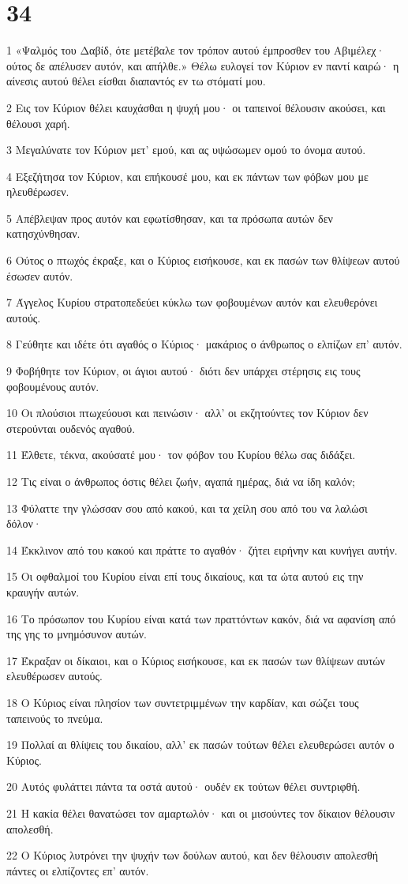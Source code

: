 \chapter{34}

\par 1 «Ψαλμός του Δαβίδ, ότε μετέβαλε τον τρόπον αυτού έμπροσθεν του Αβιμέλεχ· ούτος δε απέλυσεν αυτόν, και απήλθε.» Θέλω ευλογεί τον Κύριον εν παντί καιρώ· η αίνεσις αυτού θέλει είσθαι διαπαντός εν τω στόματί μου.
\par 2 Εις τον Κύριον θέλει καυχάσθαι η ψυχή μου· οι ταπεινοί θέλουσιν ακούσει, και θέλουσι χαρή.
\par 3 Μεγαλύνατε τον Κύριον μετ' εμού, και ας υψώσωμεν ομού το όνομα αυτού.
\par 4 Εξεζήτησα τον Κύριον, και επήκουσέ μου, και εκ πάντων των φόβων μου με ηλευθέρωσεν.
\par 5 Απέβλεψαν προς αυτόν και εφωτίσθησαν, και τα πρόσωπα αυτών δεν κατησχύνθησαν.
\par 6 Ούτος ο πτωχός έκραξε, και ο Κύριος εισήκουσε, και εκ πασών των θλίψεων αυτού έσωσεν αυτόν.
\par 7 Άγγελος Κυρίου στρατοπεδεύει κύκλω των φοβουμένων αυτόν και ελευθερόνει αυτούς.
\par 8 Γεύθητε και ιδέτε ότι αγαθός ο Κύριος· μακάριος ο άνθρωπος ο ελπίζων επ' αυτόν.
\par 9 Φοβήθητε τον Κύριον, οι άγιοι αυτού· διότι δεν υπάρχει στέρησις εις τους φοβουμένους αυτόν.
\par 10 Οι πλούσιοι πτωχεύουσι και πεινώσιν· αλλ' οι εκζητούντες τον Κύριον δεν στερούνται ουδενός αγαθού.
\par 11 Έλθετε, τέκνα, ακούσατέ μου· τον φόβον του Κυρίου θέλω σας διδάξει.
\par 12 Τις είναι ο άνθρωπος όστις θέλει ζωήν, αγαπά ημέρας, διά να ίδη καλόν;
\par 13 Φύλαττε την γλώσσαν σου από κακού, και τα χείλη σου από του να λαλώσι δόλον·
\par 14 Έκκλινον από του κακού και πράττε το αγαθόν· ζήτει ειρήνην και κυνήγει αυτήν.
\par 15 Οι οφθαλμοί του Κυρίου είναι επί τους δικαίους, και τα ώτα αυτού εις την κραυγήν αυτών.
\par 16 Το πρόσωπον του Κυρίου είναι κατά των πραττόντων κακόν, διά να αφανίση από της γης το μνημόσυνον αυτών.
\par 17 Έκραξαν οι δίκαιοι, και ο Κύριος εισήκουσε, και εκ πασών των θλίψεων αυτών ελευθέρωσεν αυτούς.
\par 18 Ο Κύριος είναι πλησίον των συντετριμμένων την καρδίαν, και σώζει τους ταπεινούς το πνεύμα.
\par 19 Πολλαί αι θλίψεις του δικαίου, αλλ' εκ πασών τούτων θέλει ελευθερώσει αυτόν ο Κύριος.
\par 20 Αυτός φυλάττει πάντα τα οστά αυτού· ουδέν εκ τούτων θέλει συντριφθή.
\par 21 Η κακία θέλει θανατώσει τον αμαρτωλόν· και οι μισούντες τον δίκαιον θέλουσιν απολεσθή.
\par 22 Ο Κύριος λυτρόνει την ψυχήν των δούλων αυτού, και δεν θέλουσιν απολεσθή πάντες οι ελπίζοντες επ' αυτόν.

